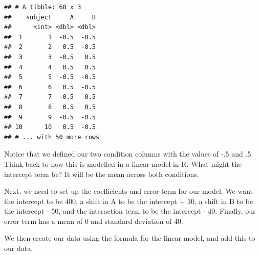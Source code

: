 \documentclass[
]{book}
\newenvironment{Shaded}{\begin{snugshade}}{\end{snugshade}}
\newcommand{\AttributeTok}[1]{\textcolor[rgb]{0.77,0.63,0.00}{#1}}
\newcommand{\CommentTok}[1]{\textcolor[rgb]{0.56,0.35,0.01}{\textit{#1}}}
\newcommand{\DecValTok}[1]{\textcolor[rgb]{0.00,0.00,0.81}{#1}}
\newcommand{\FunctionTok}[1]{\textcolor[rgb]{0.00,0.00,0.00}{#1}}
\newcommand{\NormalTok}[1]{#1}
\newcommand{\OtherTok}[1]{\textcolor[rgb]{0.56,0.35,0.01}{#1}}
\newcommand{\SpecialCharTok}[1]{\textcolor[rgb]{0.00,0.00,0.00}{#1}}
\begin{document}
\begin{Shaded}
\end{Shaded}

\begin{verbatim}
## # A tibble: 60 x 3
##    subject     A     B
##      <int> <dbl> <dbl>
##  1       1  -0.5  -0.5
##  2       2   0.5  -0.5
##  3       3  -0.5   0.5
##  4       4   0.5   0.5
##  5       5  -0.5  -0.5
##  6       6   0.5  -0.5
##  7       7  -0.5   0.5
##  8       8   0.5   0.5
##  9       9  -0.5  -0.5
## 10      10   0.5  -0.5
## # ... with 50 more rows
\end{verbatim}

Notice that we defined our two condition columns with the values of -.5 and .5. Think back to how this is modelled in a linear model in R. What might the intercept term be? It will be the mean across both conditions.

Next, we need to set up the coefficients and error term for our model. We want the intercept to be 400, a shift in A to be the intercept + 30, a shift in B to be the intercept - 50, and the interaction term to be the intercept - 40. Finally, our error term has a mean of 0 and standard deviation of 40.

We then create our data using the formula for the linear model, and add this to our data.
\end{document}
